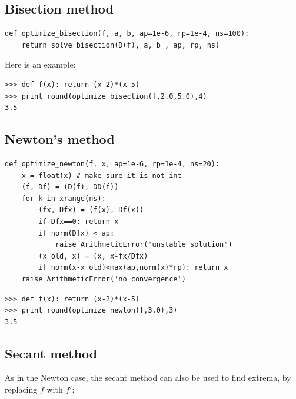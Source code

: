 \documentclass[justified,sixbynine]{tufte-book}
\def\ft{\small\tt}
\theoremstyle{plain}%
\theoremstyle{definition}
\theoremstyle{remark}
\begin{document}
\begin{fullwidth}
\goodbreak\subsection{Bisection method}


\begin{lstlisting}[caption={in file: {\ft nlib.py}}]
def optimize_bisection(f, a, b, ap=1e-6, rp=1e-4, ns=100):
    return solve_bisection(D(f), a, b , ap, rp, ns)
\end{lstlisting}

Here is an example:

\begin{lstlisting}[caption={in file: {\ft nlib.py}}]
>>> def f(x): return (x-2)*(x-5)
>>> print round(optimize_bisection(f,2.0,5.0),4)
3.5
\end{lstlisting}

\goodbreak\subsection{Newton's method}


\begin{lstlisting}[caption={in file: {\ft nlib.py}}]
def optimize_newton(f, x, ap=1e-6, rp=1e-4, ns=20):
    x = float(x) # make sure it is not int
    (f, Df) = (D(f), DD(f))
    for k in xrange(ns):
        (fx, Dfx) = (f(x), Df(x))
        if Dfx==0: return x
        if norm(Dfx) < ap:
            raise ArithmeticError('unstable solution')
        (x_old, x) = (x, x-fx/Dfx)
        if norm(x-x_old)<max(ap,norm(x)*rp): return x
    raise ArithmeticError('no convergence')
\end{lstlisting}

\begin{lstlisting}[caption={in file: {\ft nlib.py}}]
>>> def f(x): return (x-2)*(x-5)
>>> print round(optimize_newton(f,3.0),3)
3.5
\end{lstlisting}

\goodbreak\subsection{Secant method}


As in the Newton case, the secant method can also be used to find extrema, by replacing $f$ with $f'$:


\end{fullwidth}
\end{document}
